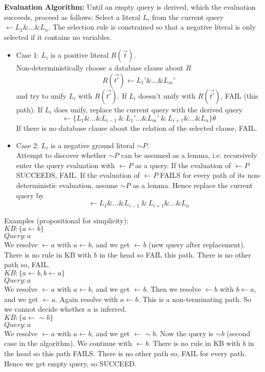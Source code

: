 \documentclass{article}
\begin{document}
\textbf{Evaluation Algorithm:} Until an empty query is derived, which the evaluation succeeds, proceed as follows: 
Select a literal $L_i$ from the current query $\leftarrow L_1\&\ldots\&L_n$. The selection rule is constrained so that a negative literal is only selected if it contains no variables.
\begin{itemize}
	\item Case 1: $L_i$ is a positive literal $R(\vec{t})$.\\
	Non-deterministically choose a database clause about $R$\\
	\[R(\vec{t'})\leftarrow L_1'\&\ldots\&L_m'\]
	and try to unify $L_i$ with $R(\vec{t'})$. If $L_i$ doesn't unify with $R(\vec{t'})$, FAIL (this path). If $L_i$ does unify, replace the current query with the derived query
	\[\leftarrow \{L_1\&\ldots\&L_{i-1}\ \& \ L_1'\ldots\&L_m'\ \& \ L_{i+1}\&\ldots\&L_n\}\theta\]
	If there is no database clause about the relation of the selected clause, FAIL.
	\item Case 2: $L_i$ is a negative ground literal ${\sim} P$.\\
	Attempt to discover whether ${\sim} P$ can be assumed as a lemma, i.e. recursively enter the query evaluation with $\leftarrow P$ as a query. If the evaluation of $\leftarrow P$ SUCCEEDS, FAIL. If the evaluation of $\leftarrow P$ FAILS for every path of its non-deterministic evaluation, assume ${\sim} P$ as a lemma. Hence replace the current query by
	\[ \leftarrow L_1\&\ldots\&L_{i-1}\ \& \ L_{i+1}\&\ldots\&L_n\]
\end{itemize}
Examples (propositional for simplicity):\\
$KB: \{a\leftarrow b\}$\\
$Query: a$\\
We resolve $\leftarrow a$ with $a\leftarrow b$, and we get $\leftarrow b$ (new query after replacement). There is no rule in KB with $b$ in the head so FAIL this path. There is no other path so, FAIL.\\

$KB: \{a\leftarrow b, b\leftarrow a\}$\\
$Query: a$\\
We resolve $\leftarrow a$ with $a\leftarrow b$, and we get $\leftarrow b$. Then we resolve $\leftarrow b$ with $b\leftarrow a$, and we get $\leftarrow a$. Again resolve with  $a\leftarrow b$. This is a non-terminating path. So we cannot decide whether $a$ is inferred.\\

$KB: \{a\leftarrow {\sim}b\}$\\
$Query: a$\\
We resolve $\leftarrow a$ with $a\leftarrow b$, and we get $\leftarrow {\sim}b$. Now the query is ${\sim}b$ (second case in the algorithm). We continue with $\leftarrow b$. There is no rule in KB with $b$ in the head so this path FAILS. There is no other path so, FAIL for every path. Hence we get empty query, so SUCCEED.
\end{document}
